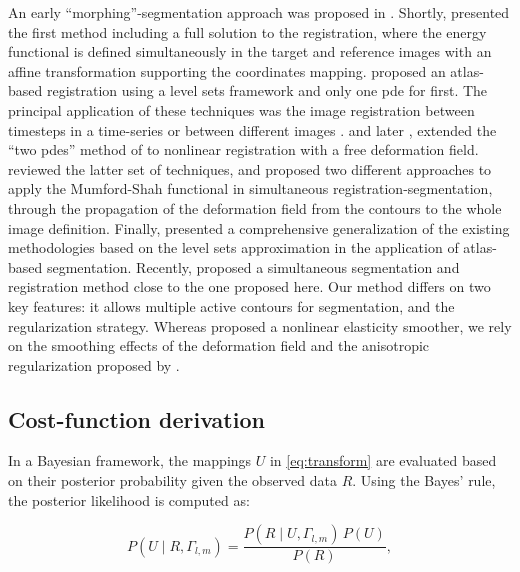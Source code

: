 An early ``morphing''-segmentation approach was proposed in \citep{bertalmio_morphing_2000}.
Shortly, \cite{yezzi_variational_2001} presented the first method including a full solution to
  the registration, where the energy functional is defined simultaneously in the target
  and reference images with an affine transformation supporting the coordinates mapping.
\cite{vemuri_joint_2003} proposed an atlas-based registration using a level sets
  framework and only one \gls*{pde} for first.
The principal application of these techniques was the image registration between timesteps in
  a time-series or between different images \citep{paragios_level_2003}.
\cite{unal_coupled_2005} and later \cite{wang_joint_2006},
  extended the ``two \glspl*{pde}'' method of \cite{yezzi_variational_2001}
  to nonlinear registration with a free deformation field.
\cite{droske_mumfordshah_2009} reviewed the latter set of techniques, and proposed two different
  approaches to apply the Mumford-Shah functional \citep{mumford_optimal_1989} in simultaneous
  registration-segmentation, through the propagation of the deformation field from
  the contours to the whole image definition.
Finally, \cite{gorthi_active_2011} presented a comprehensive generalization of the
  existing methodologies based on the level sets approximation in the application of
  atlas-based segmentation.
Recently, \cite{guyader_combined_2011} proposed a simultaneous segmentation and
  registration method close to the one proposed here.
Our method differs on two key features:
  it allows multiple active contours for segmentation, and the regularization strategy.
Whereas \cite{guyader_combined_2011} proposed a nonlinear elasticity smoother, we rely on
  the smoothing effects of the deformation field and the anisotropic regularization
  proposed by \cite{nagel_investigation_1986}.


\subsection*{Cost-function derivation}\label{sec:methods_map}

In a Bayesian framework, the mappings $U$ in \eqref{eq:transform} are
  evaluated based on their posterior probability given the observed data
  $R$.
Using the Bayes' rule, the posterior likelihood is computed as:

  \begin{equation}
  P(U \mid R,\Gamma_{l,m}) = \frac{P(R \mid U,\Gamma_{l,m})\, P(U)}{P(R)},
  \label{eq:bayes_rule}
  \end{equation}

